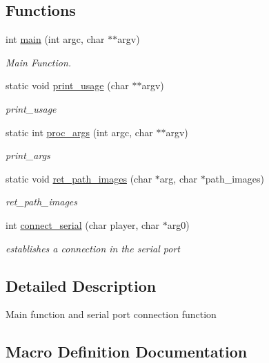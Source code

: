 \subsection*{Functions}
\begin{DoxyCompactItemize}
\item 
int \hyperlink{group__proj_ga3c04138a5bfe5d72780bb7e82a18e627}{main} (int argc, char $\ast$$\ast$argv)
\begin{DoxyCompactList}\small\item\em Main Function. \end{DoxyCompactList}\item 
static void \hyperlink{group__proj_ga7721a8566abc323f59672fdde30d3e20}{print\+\_\+usage} (char $\ast$$\ast$argv)
\begin{DoxyCompactList}\small\item\em print\+\_\+usage \end{DoxyCompactList}\item 
static int \hyperlink{group__proj_ga97b25d50dc55b5c8c2315fd010bc2957}{proc\+\_\+args} (int argc, char $\ast$$\ast$argv)
\begin{DoxyCompactList}\small\item\em print\+\_\+args \end{DoxyCompactList}\item 
static void \hyperlink{group__proj_ga3310cf47c29dd0f685c58e04fac7be4a}{ret\+\_\+path\+\_\+images} (char $\ast$arg, char $\ast$path\+\_\+images)
\begin{DoxyCompactList}\small\item\em ret\+\_\+path\+\_\+images \end{DoxyCompactList}\item 
int \hyperlink{group__proj_gac4a55a52afabd10db600de603282ff99}{connect\+\_\+serial} (char player, char $\ast$arg0)
\begin{DoxyCompactList}\small\item\em establishes a connection in the serial port \end{DoxyCompactList}\end{DoxyCompactItemize}


\subsection{Detailed Description}
Main function and serial port connection function 

\subsection{Macro Definition Documentation}
\hypertarget{group__proj_ga698fc99ce97e8051ede3e8e9c9baaaf1}{}\label{group__proj_ga698fc99ce97e8051ede3e8e9c9baaaf1} 
